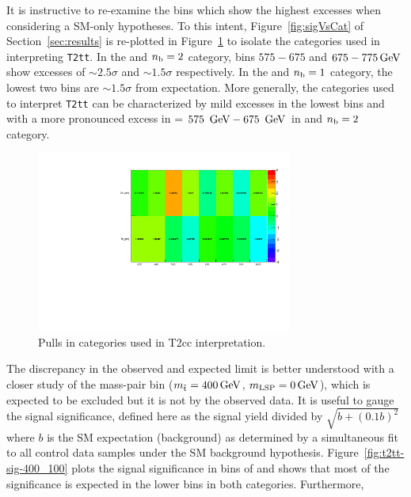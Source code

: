 It is instructive to re-examine the \scalht bins which show the highest excesses 
when considering a SM-only hypotheses. To this intent, Figure~\ref{fig:sigVsCat} of 
Section~\ref{sec:results} is re-plotted in Figure~\ref{fig:sigVsCat2} to 
isolate the categories used in interpreting \texttt{T2tt}. In the \njethigh 
and $n_{\text{b}} = 2$ category, \scalht bins $575-675$ and $675-775\,\text{Ge\hspace{-.08em}V}$ show excesses of 
$\sim\!\!2.5\sigma$ and $\sim\!\!1.5\sigma$ respectively. In the \njethigh and 
$n_{\text{b}} = 1$ category, the lowest two \scalht bins are $\sim\!\!1.5\sigma$ 
from expectation. More generally, the categories used to interpret \texttt{T2tt} can be
characterized by mild excesses in the lowest \scalht bins and with
a more pronounced excess in \scalht = $575~\,\text{Ge\hspace{-.08em}V}-675~\,\text{Ge\hspace{-.08em}V}$ in \njethigh 
and $n_{\text{b}} = 2$ category. 
\begin{figure}[h!]
  \begin{center}
      \includegraphics[width=0.75\textwidth, trim=0 0 0 30, clip=true]{figures/fit/v22/significances_catVsHt_2}
    \caption{Pulls in categories used in T2cc interpretation.\label{fig:sigVsCat2}}
  \end{center}
\end{figure}
The discrepancy in the observed and expected 
limit is better understood with a closer study of the mass-pair
bin ($m_{\tilde{\rm t}} = 400\,\text{Ge\hspace{-.08em}V}$, $m_{\text{LSP}} = 0\,\text{Ge\hspace{-.08em}V}$), which is 
expected to be excluded but it is not by the observed data. 
It is useful to gauge the signal significance, defined here as the signal 
yield divided by $\sqrt{b+(0.1b)^2}$ where $b$ is the SM expectation (background) 
as determined by a simultaneous fit to all control data samples under the SM background 
hypothesis. Figure~\ref{fig:t2tt-sig-400_100} plots the signal significance in bins of 
\scalht and shows that most of the significance is expected in the 
lower \scalht bins in both categories. Furthermore, 
